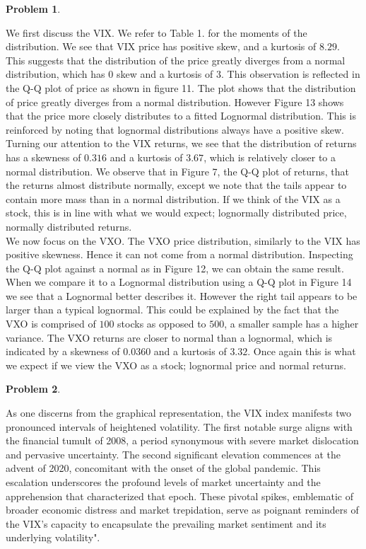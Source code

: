 \documentclass[12pt, a4paper]{article}
\newtheorem{problem}{Problem}
\theoremstyle{definition}
\begin{document}
\begin{problem}
\end{problem}
\quad We first discuss the VIX. We refer to Table 1. for the moments of the distribution. 
We see that VIX price has positive skew, and a kurtosis of $8.29$. This suggests that the distribution of the price greatly diverges from a normal distribution, which has $0$ skew and a kurtosis of $3$. This observation is reflected in the Q-Q plot of price as shown in figure 11. The plot shows that the distribution of price greatly diverges from a normal distribution. However Figure 13 shows that the price more closely distributes to a fitted Lognormal distribution. This is reinforced by noting that lognormal distributions always have a positive skew. Turning our attention to the VIX returns, we see that the distribution of returns has a skewness of $0.316$ and a kurtosis of $3.67$, which is relatively closer to a normal distribution.
We observe that in Figure 7, the Q-Q plot of returns, that the returns almost distribute normally, except we note that the tails appear to contain more mass than in a normal distribution. 
If we think of the VIX as a stock, this is in line with what we would expect; lognormally distributed price, normally distributed returns.
\\

\quad We now focus on the VXO. The VXO price distribution, similarly to the VIX has positive skewness. Hence it can not come from a normal distribution. Inspecting the Q-Q plot against a normal as in Figure 12, we can obtain the same result. When we compare it to a Lognormal distribution using a Q-Q plot in Figure 14 we see that a Lognormal better describes it. However the right tail appears to be larger than a typical lognormal. This could be explained by the fact that the VXO is comprised of $100$ stocks as opposed to $500$, a smaller sample has a higher variance. The VXO returns are closer to normal than a lognormal, which is indicated by a skewness of $0.0360$ and a kurtosis of $3.32$. Once again this is what we expect if we view the VXO as a stock; lognormal price and normal returns. 

\begin{problem}
\end{problem}
\quad As one discerns from the graphical representation, the VIX index manifests two pronounced intervals of heightened volatility. The first notable surge aligns with the financial tumult of 2008, a period synonymous with severe market dislocation and pervasive uncertainty. The second significant elevation commences at the advent of 2020, concomitant with the onset of the global pandemic. This escalation underscores the profound levels of market uncertainty and the apprehension that characterized that epoch. These pivotal spikes, emblematic of broader economic distress and market trepidation, serve as poignant reminders of the VIX's capacity to encapsulate the prevailing market sentiment and its underlying volatility".
\\
\end{document}
